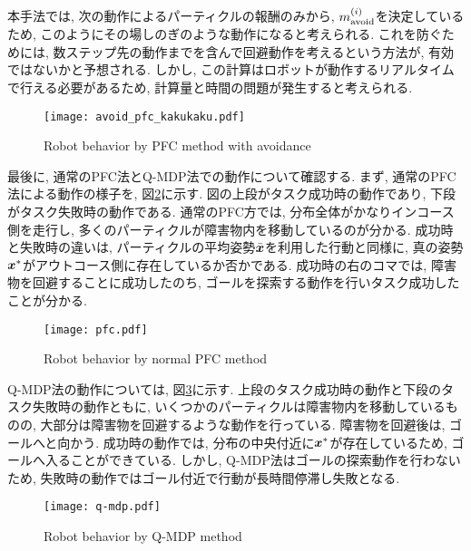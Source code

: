 本手法では, 次の動作によるパーティクルの報酬のみから, $m^{(i)}_{\rm avoid}$を決定しているため, 
このようにその場しのぎのような動作になると考えられる. 
これを防ぐためには, 数ステップ先の動作までを含んで回避動作を考えるという方法が, 有効ではないかと予想される. 
しかし, この計算はロボットが動作するリアルタイムで行える必要があるため, 計算量と時間の問題が発生すると考えられる. 

\begin{figure}[H]
  \begin{center}
    \texttt{[image: avoid\_pfc\_kakukaku.pdf]}
    \caption{Robot behavior by PFC method with avoidance}
    \label{fig:avoid pfc kakukaku}
  \end{center}
\end{figure}

最後に, 通常のPFC法とQ-MDP法での動作について確認する. 
まず, 通常のPFC法による動作の様子を, 図\ref{fig:pfc}に示す. 
図の上段がタスク成功時の動作であり, 下段がタスク失敗時の動作である. 
通常のPFC方では, 分布全体がかなりインコース側を走行し, 多くのパーティクルが障害物内を移動しているのが分かる. 
成功時と失敗時の違いは, パーティクルの平均姿勢$\bar{\boldsymbol{x}}$を利用した行動と同様に, 真の姿勢$\boldsymbol{x}^{*}$がアウトコース側に存在しているか否かである. 
成功時の右のコマでは, 障害物を回避することに成功したのち, ゴールを探索する動作を行いタスク成功したことが分かる. 

\begin{figure}[H]
  \begin{center}
    \texttt{[image: pfc.pdf]}
    \caption{Robot behavior by normal PFC method}
    \label{fig:pfc}
  \end{center}
\end{figure}

Q-MDP法の動作については, 図\ref{fig:q-mdp}に示す. 
上段のタスク成功時の動作と下段のタスク失敗時の動作ともに, いくつかのパーティクルは障害物内を移動しているものの, 
大部分は障害物を回避するような動作を行っている. 
障害物を回避後は, ゴールへと向かう. 
成功時の動作では, 分布の中央付近に$\boldsymbol{x}^{*}$が存在しているため, ゴールへ入ることができている. 
しかし, Q-MDP法はゴールの探索動作を行わないため, 失敗時の動作ではゴール付近で行動が長時間停滞し失敗となる. 

\begin{figure}[H]
  \begin{center}
    \texttt{[image: q-mdp.pdf]}
    \caption{Robot behavior by Q-MDP method}
    \label{fig:q-mdp}
  \end{center}
\end{figure}

